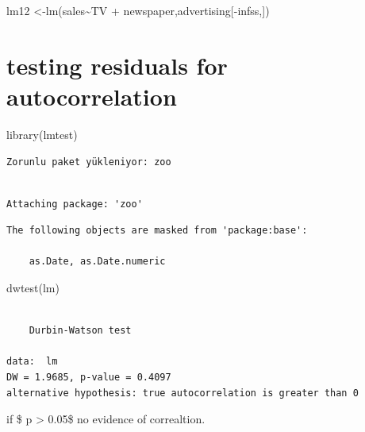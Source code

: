 \documentclass[
  letterpaper,
  DIV=11,
  numbers=noendperiod]{scrreprt}
\newenvironment{Shaded}{\begin{snugshade}}{\end{snugshade}}
\newcommand{\FunctionTok}[1]{\textcolor[rgb]{0.02,0.16,0.49}{#1}}
\newcommand{\NormalTok}[1]{\textcolor[rgb]{0.33,0.33,0.33}{#1}}
\newcommand{\OtherTok}[1]{\textcolor[rgb]{0.85,0.12,0.09}{#1}}
\newcommand{\SpecialCharTok}[1]{\textcolor[rgb]{0.00,0.46,0.62}{#1}}
\begin{document}
\begin{Shaded}
\begin{Highlighting}[]
\NormalTok{lm12 }\OtherTok{\textless{}{-}}\FunctionTok{lm}\NormalTok{(sales}\SpecialCharTok{\textasciitilde{}}\NormalTok{TV }\SpecialCharTok{+}\NormalTok{ newspaper,advertising[}\SpecialCharTok{{-}}\NormalTok{infss,])}
\end{Highlighting}
\end{Shaded}

\hypertarget{testing-residuals-for-autocorrelation}{%
\section{testing residuals for
autocorrelation}\label{testing-residuals-for-autocorrelation}}

\begin{Shaded}
\begin{Highlighting}[]
\FunctionTok{library}\NormalTok{(lmtest)}
\end{Highlighting}
\end{Shaded}

\begin{verbatim}
Zorunlu paket yükleniyor: zoo
\end{verbatim}

\begin{verbatim}

Attaching package: 'zoo'
\end{verbatim}

\begin{verbatim}
The following objects are masked from 'package:base':

    as.Date, as.Date.numeric
\end{verbatim}

\begin{Shaded}
\begin{Highlighting}[]
\FunctionTok{dwtest}\NormalTok{(lm) }
\end{Highlighting}
\end{Shaded}

\begin{verbatim}

    Durbin-Watson test

data:  lm
DW = 1.9685, p-value = 0.4097
alternative hypothesis: true autocorrelation is greater than 0
\end{verbatim}

if \$ p \textgreater{} 0.05\$ no evidence of correaltion.
\end{document}
